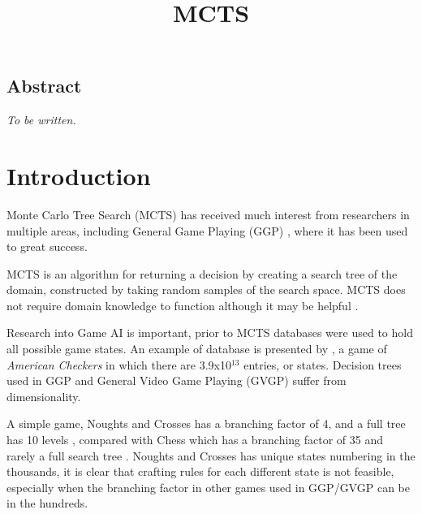 \documentclass[conference]{IEEEtran}
\begin{document}
\date{}

\title{\Large\bf MCTS}

\author{
}
 
\maketitle
\thispagestyle{empty}

\subsection*{\centering Abstract}
{\em
To be written.  
}

\section{Introduction}
Monte Carlo Tree Search (MCTS) has received much interest from researchers in multiple areas, including General Game Playing (GGP) \cite{sironi},  where it has been used to great success.

MCTS is an algorithm for returning a decision by creating a search tree of the domain, constructed by taking random samples of the search space. MCTS does not require domain knowledge to function although it may be helpful \cite{sironi}.

Research into Game AI is important, prior to MCTS databases were used to hold all possible game states. An example of database is presented by \cite{evomcts}, a game of {\em American Checkers} in which there are 3.9x10$^{13}$ entries, or states. Decision trees used in GGP and General Video Game Playing (GVGP) suffer from dimensionality. 

A simple game, Noughts and Crosses has a branching factor of 4, and a full tree has 10 levels \cite{bartle}, compared with Chess which has a branching factor of 35 and rarely a full search tree \cite{bartle}. Noughts and Crosses has unique states numbering in the thousands, it is clear that crafting rules for each different state is not feasible, especially when the branching factor in other games used in GGP/GVGP can be in the hundreds. 
\end{document}
